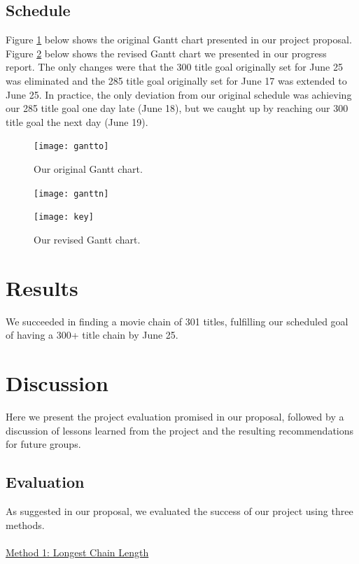 \documentclass[11pt,english]{article}
\begin{document}
\subsection{Schedule}
Figure \ref{fig:gantto} below shows the original Gantt chart presented in
our project proposal. Figure \ref{fig:ganttn} below shows the revised Gantt
chart we presented in our progress report. The only changes were that the 300
title goal originally set for June 25 was eliminated and the 285 title goal
originally set for June 17 was extended to June 25. In practice, the only
deviation from our original schedule was achieving our 285 title goal one day
late (June 18), but we caught up by reaching our 300 title goal the next day
(June 19).
\begin{figure}[h]
\begin{center}
\texttt{[image: gantto]}
\end{center}
\vspace{-7mm}
\caption{Our original Gantt chart.}
\label{fig:gantto}
\end{figure}
\begin{figure}[h]
\begin{center}
\texttt{[image: ganttn]}
\end{center}
\vspace{-7mm}
\caption{Our revised Gantt chart.}
\label{fig:ganttn}
\texttt{[image: key]}
\end{figure}

\section{Results}
We succeeded in finding a movie chain of 301 titles, fulfilling our scheduled
goal of having a 300+ title chain by June 25.

\section{Discussion}
Here we present the project evaluation promised in our proposal, followed by
a discussion of lessons learned from the project and the resulting
recommendations for future groups.
\subsection{Evaluation}
As suggested in our proposal, we evaluated the success of our project using
three methods.\\\\
\underline{Method 1: Longest Chain Length}
\end{document}
